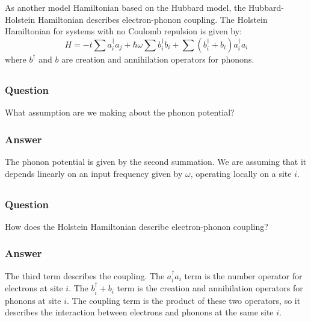 \documentclass[12pt]{article}
\begin{document}
\section{}
As another model Hamiltonian based on the Hubbard model, the Hubbard-Holstein Hamiltonian describes electron-phonon coupling. The Holstein Hamiltonian for systems with no Coulomb repulsion is given by:
\begin{equation}
    H=-t\sum a^{\dag}_{i}a_{j} +\hbar\omega \sum b^{\dag}_{i}b_{i} + \sum (b^{\dag}_{i}+b_{i})a^{\dag}_{i}a_{i}
\end{equation}
where $b^{\dag}$ and $b$ are creation and annihilation operators for phonons.
\subsection{}
\subsubsection{Question}
What assumption are we making about the phonon potential?
\subsubsection{Answer}
The phonon potential is given by the second summation. We are assuming that it depends linearly on an input frequency given by $\omega$, operating locally on a site $i$.
\subsection{}
\subsubsection{Question}
How does the Holstein Hamiltonian describe electron-phonon coupling?
\subsubsection{Answer}
The third term describes the coupling. The $a^{\dag}_{i}a_{i}$ term is the number operator for electrons at site $i$. The $b^{\dag}_{i}+b_{i}$ term is the creation and annihilation operators for phonons at site $i$. The coupling term is the product of these two operators, so it describes the interaction between electrons and phonons at the same site $i$.
\end{document}
